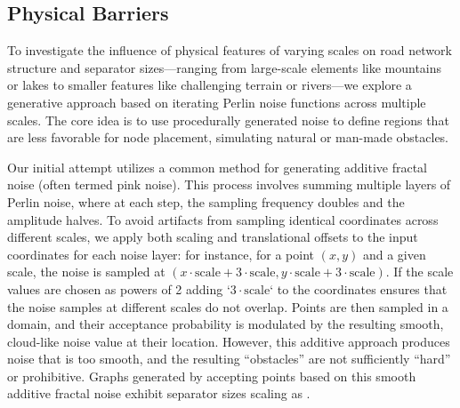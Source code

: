 



















\subsection{Physical Barriers}
\label{sec:synthetic:physical_barriers}

To investigate the influence of physical features of varying scales on road network structure and separator sizes—ranging from large-scale elements like mountains or lakes to smaller features like challenging terrain or rivers—we explore a generative approach based on iterating Perlin noise functions across multiple scales.
The core idea is to use procedurally generated noise to define regions that are less favorable for node placement, simulating natural or man-made obstacles.

Our initial attempt utilizes a common method for generating additive fractal noise (often termed pink noise).
This process involves summing multiple layers of Perlin noise, where at each step, the sampling frequency doubles and the amplitude halves.
To avoid artifacts from sampling identical coordinates across different scales, we apply both scaling and translational offsets to the input coordinates for each noise layer: for instance, for a point \((x,y)\) and a given scale, the noise is sampled at \((x \cdot \text{scale} + 3 \cdot \text{scale}, y \cdot \text{scale} + 3 \cdot \text{scale})\).
If the scale values are chosen as powers of 2 adding `\(3 \cdot \text{scale}\)` to the coordinates ensures that the noise samples at different scales do not overlap.
Points are then sampled in a domain, and their acceptance probability is modulated by the resulting smooth, cloud-like noise value at their location.
However, this additive approach produces noise that is too smooth, and the resulting \enquote{obstacles} are not sufficiently \enquote{hard} or prohibitive.
Graphs generated by accepting points based on this smooth additive fractal noise exhibit separator sizes scaling as .

